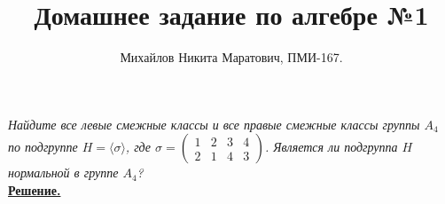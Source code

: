 \documentclass[14pt,a4paper]{scrartcl}
\title{
     Домашнее задание по алгебре №1\\
 }
\author{Михайлов Никита Маратович, ПМИ-167.\\
}
\date{}
\begin{document}
\maketitle
\begin{spacing}{1}

\begin{center}
\end{center}
\textit{Найдите все левые смежные классы и все правые смежные классы группы $A_4$ по подгруппе $H = \langle \sigma \rangle$, где $\sigma = 
\left(
\begin{array}{cccc}
     1 & 2 & 3 & 4  \\
     2 & 1 & 4 & 3 
\end{array}
\right)$. Является ли подгруппа $H$ нормальной в группе $A_4$?} \\
\noindent \underline{\textbf{Решение.}} 

\end{spacing}
\end{document}
